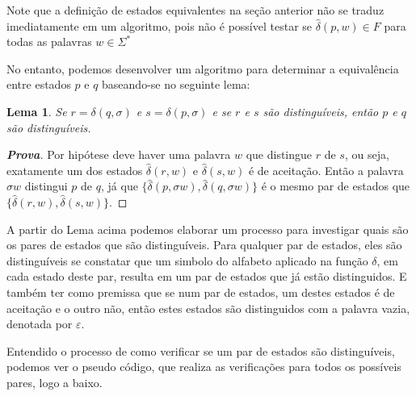 \documentclass[
	12pt,				%
	openany,
	oneside,
	a4paper,			%
	english,			%
	brazil				%
	]{abntex2}
\begin{document}
  Note que a definição de estados equivalentes na seção anterior não se traduz imediatamente em um algoritmo, pois não é possível testar se $\hat{\delta}(p, w) \in F$ para todas as palavras $w \in \Sigma^*$

  No entanto, podemos desenvolver um algoritmo para determinar a equivalência entre estados $p$ e $q$ baseando-se no seguinte lema:

  \newtheorem{lemma}{Lema}
  \begin{lemma}
    \label{lemma01}
    Se $r = \delta(q,\sigma)$ e $s = \delta(p,\sigma)$ e se $r$ e $s$ são  distinguíveis, então $p$ e $q$ são distinguíveis.
  \end{lemma}


  \begin{proof}[\textbf{Prova}]
    Por hipótese deve haver uma palavra $w$ que distingue $r$ de $s$, ou seja, exatamente um dos estados $\hat{\delta}(r, w)$ e $\hat{\delta}(s, w)$ é de aceitação. Então a palavra $\sigma w$ distingui $p$ de $q$, já que $\{\hat{\delta}(p, \sigma w), \hat{\delta}(q, \sigma w)\}$ é o mesmo par de estados que $\{\hat{\delta}(r, w), \hat{\delta}(s, w)\}$.
  \end{proof}



  A partir do Lema acima podemos elaborar um processo para investigar quais são os pares de estados que são distinguíveis. Para qualquer par de estados, eles são distinguíveis se constatar que um simbolo do alfabeto aplicado na função $\delta$, em cada estado deste par, resulta em um par de estados que já estão distinguidos. E também ter como premissa que se num par de estados, um destes estados é de aceitação e o outro não, então estes estados são distinguidos com a palavra vazia, denotada por $\varepsilon$.

  Entendido o processo de como verificar se um par de estados são distinguíveis, podemos ver o pseudo código, que realiza as verificações para todos os possíveis pares, logo a baixo.\\
\end{document}
